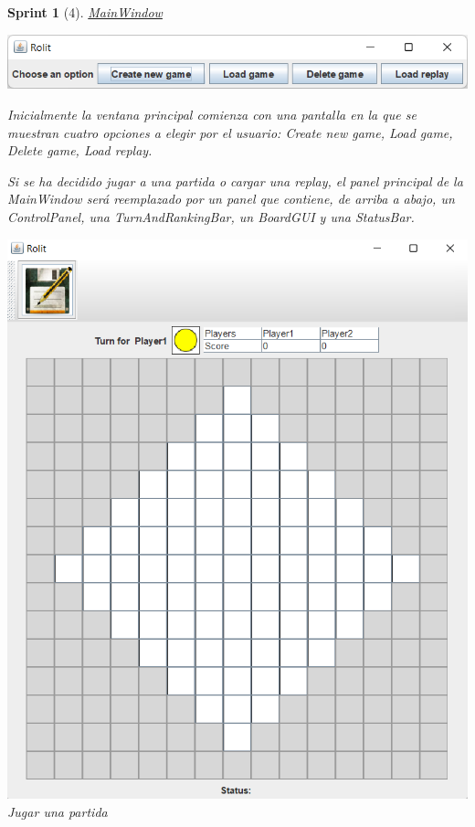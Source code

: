 \documentclass{article}
\theoremstyle{break}
\newtheorem*{sprint}{Sprint}
\begin{document}
\begin{sprint}[4]
\underline{MainWindow}
\begin{center}
\includegraphics[scale=0.8]{menu-sprint3.png}
\end{center}

Inicialmente la ventana principal comienza con una pantalla en la que se muestran cuatro opciones a elegir por el usuario: \textit{Create new game, Load game, Delete game, Load replay}.

Si se ha decidido jugar a una partida o cargar una replay, el panel principal de la \textit{MainWindow} será reemplazado por un panel que contiene, de arriba a abajo, un ControlPanel, una TurnAndRankingBar, un BoardGUI y una StatusBar.

\begin{center}
\includegraphics[scale=0.9]{game-sprint3.png}
Jugar una partida
\end{center}


\end{sprint}
\end{document}
